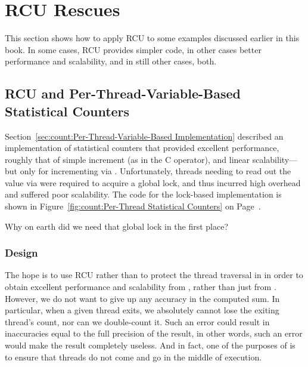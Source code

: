 
\section{RCU Rescues}
\label{sec:together:RCU Rescues}

This section shows how to apply RCU to some examples discussed earlier
in this book.
In some cases, RCU provides simpler code, in other cases better
performance and scalability, and in still other cases, both.

\subsection{RCU and Per-Thread-Variable-Based Statistical Counters}
\label{sec:together:RCU and Per-Thread-Variable-Based Statistical Counters}

Section~\ref{sec:count:Per-Thread-Variable-Based Implementation}
described an implementation of statistical counters that provided
excellent
performance, roughly that of simple increment (as in the C \co{++}
operator), and linear scalability---but only for incrementing
via .
Unfortunately, threads needing to read out the value via 
were required to acquire a global
lock, and thus incurred high overhead and suffered poor scalability.
The code for the lock-based implementation is shown in
Figure~\ref{fig:count:Per-Thread Statistical Counters} on
Page~\pageref{fig:count:Per-Thread Statistical Counters}.

\QuickQuiz{}
	Why on earth did we need that global lock in the first place?
 \QuickQuizEnd

\subsubsection{Design}

The hope is to use RCU rather than  to protect the
thread traversal in  in order to obtain excellent
performance and scalability from , rather than just
from .
However, we do not want to give up any accuracy in the computed sum.
In particular, when a given thread exits, we absolutely cannot
lose the exiting thread's count, nor can we double-count it.
Such an error could result in inaccuracies equal to the full
precision of the result, in other words, such an error would
make the result completely useless.
And in fact, one of the purposes of  is to
ensure that threads do not come and go in the middle of 
execution.

